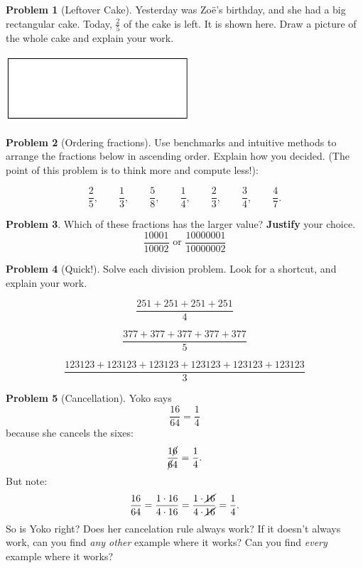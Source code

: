 \documentclass[10pt, reqno]{amsart}
\theoremstyle{remark}
\theoremstyle{definition}
\newtheorem{problem}{Problem}
\numberwithin{equation}{section}  %
\begin{document}
\begin{problem}[Leftover Cake]
Yesterday was Zo\"e's birthday, and she had a big rectangular cake.  Today, $\frac 2 5$ of the cake is left.  It is shown here. Draw a picture of the whole cake and explain your work.


\bigskip
\begin{center}
\includegraphics[height=2.5cm]{cake}
\end{center}

\end{problem}



\begin{problem}[Ordering fractions]
Use benchmarks and intuitive methods to arrange the fractions below in ascending order. Explain how you decided. (The point of this problem is to think more and compute less!):

\[
\frac 2 5 , \quad\quad \frac 1 3 , \quad\quad\frac 5 8 , \quad\quad \frac 1 4 , \quad \quad\frac 2 3 , \quad\quad  \frac 3 4, \quad\quad \frac 4 7.
\]

\end{problem}


\begin{problem}
Which of these fractions has the larger value?   {\bf Justify} your choice.  
\[
\frac{10001}{10002}   \text{  or }    \frac{10000001}{10000002}
\]

\end{problem}


\begin{problem}[Quick!]
Solve each division problem.  Look for a shortcut, and explain your work.

\[
\frac{251 + 251 + 251 +251}{4}
\]



\[
\frac{377 + 377 + 377 + 377 + 377}{5}
\]


\[
\frac{123123 + 123123 + 123123 + 123123 + 123123 + 123123}{3}
\]

\end{problem}



\begin{problem}[Cancellation]

Yoko says
\[
\frac{16}{64} = \frac 1 4
\]
because she cancels the sixes:
\[
\frac{1\cancel{6}}{\cancel{6}4} = \frac 1 4.
\]
But note:
\[
\frac{16}{64} = \frac{1 \cdot 16}{4\cdot 16} = \frac{1 \cdot \cancel{16}}{4\cdot \cancel{16}} = \frac 1 4.
\]
So is Yoko right?  Does her cancelation rule always work?
If it doesn't always work, can you find \emph{any other} example where it works?  Can you find \emph{every} example where it works?

\end{problem}
\end{document}
